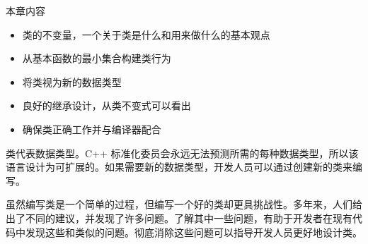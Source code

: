 本章内容

\begin{itemize}
\item
类的不变量，一个关于类是什么和用来做什么的基本观点

\item
从基本函数的最小集合构建类行为

\item
将类视为新的数据类型

\item
良好的继承设计，从类不变式可以看出

\item
确保类正确工作并与编译器配合
\end{itemize}

类代表数据类型。C++ 标准化委员会永远无法预测所需的每种数据类型，所以该语言设计为可扩展的。如果需要新的数据类型，开发人员可以通过创建新的类来编写。

虽然编写类是一个简单的过程，但编写一个好的类却更具挑战性。多年来，人们给出了不同的建议，并发现了许多问题。了解其中一些问题，有助于开发者在现有代码中发现这些和类似的问题。彻底消除这些问题可以指导开发人员更好地设计类。
